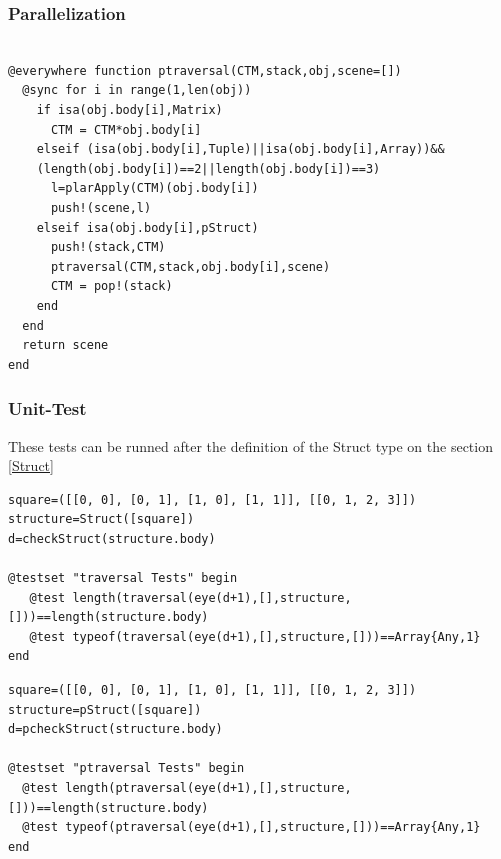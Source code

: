 \documentclass[a4paper,12pt]{article}
\begin{document}
\subsubsection{Parallelization}
\begin{Verbatim}[fontsize=\footnotesize]

@everywhere function ptraversal(CTM,stack,obj,scene=[])
  @sync for i in range(1,len(obj))
    if isa(obj.body[i],Matrix)
      CTM = CTM*obj.body[i]
    elseif (isa(obj.body[i],Tuple)||isa(obj.body[i],Array))&&
    (length(obj.body[i])==2||length(obj.body[i])==3)
      l=plarApply(CTM)(obj.body[i])
      push!(scene,l)
    elseif isa(obj.body[i],pStruct)
      push!(stack,CTM)
      ptraversal(CTM,stack,obj.body[i],scene)
      CTM = pop!(stack)
    end
  end
  return scene
end

\end{Verbatim}
\subsubsection{Unit-Test}
These tests can be runned after the definition of the Struct type on the section \ref{Struct}
\vspace{25px}

\noindent {}
\begin{Verbatim}[fontsize=\footnotesize]
square=([[0, 0], [0, 1], [1, 0], [1, 1]], [[0, 1, 2, 3]])
structure=Struct([square])
d=checkStruct(structure.body)

@testset "traversal Tests" begin
   @test length(traversal(eye(d+1),[],structure,[]))==length(structure.body)
   @test typeof(traversal(eye(d+1),[],structure,[]))==Array{Any,1}
end
\end{Verbatim}

\noindent {}
\begin{Verbatim}[fontsize=\footnotesize]
square=([[0, 0], [0, 1], [1, 0], [1, 1]], [[0, 1, 2, 3]])
structure=pStruct([square])
d=pcheckStruct(structure.body)

@testset "ptraversal Tests" begin
  @test length(ptraversal(eye(d+1),[],structure,[]))==length(structure.body)
  @test typeof(ptraversal(eye(d+1),[],structure,[]))==Array{Any,1}
end
\end{Verbatim}
\end{document}
